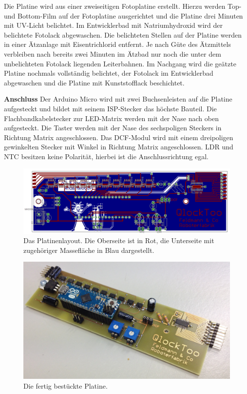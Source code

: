 \begin{multicols}{2}
Die Platine wird aus einer zweiseitigen Fotoplatine erstellt. Hierzu werden Top- und Bottom-Film auf der Fotoplatine ausgerichtet und die Platine drei Minuten mit UV-Licht belichtet. Im Entwicklerbad mit Natriumhydroxid wird der belichtete Fotolack abgewaschen. Die belichteten Stellen auf der Platine werden in einer Ätzanlage mit Eisentrichlorid entfernt. Je nach Güte des Ätzmittels verbleiben nach bereits zwei Minuten im Ätzbad nur noch die unter dem unbelichteten Fotolack liegenden Leiterbahnen. Im Nachgang wird die geätzte Platine nochmals vollständig belichtet, der Fotolack im Entwicklerbad abgewaschen und die Platine mit Kunststofflack beschichtet.

\textbf{Anschluss} Der Arduino Micro wird mit zwei Buchsenleisten auf die Platine aufgesteckt und bildet mit seinem ISP-Stecker das höchste Bauteil. Die Flachbandkabelstecker zur LED-Matrix werden mit der Nase nach oben aufgesteckt. Die Taster werden mit der Nase des sechspoligen Steckers in Richtung Matrix angeschlossen. Das DCF-Modul wird mit einem dreipoligen gewinkelten Stecker mit Winkel in Richtung Matrix angeschlossen. LDR und NTC besitzen keine Polarität, hierbei ist die Anschlussrichtung egal.
\end{multicols}

\begin{figure}[H]
    \centering
    \includegraphics[width=\textwidth]{Abbildungen/Elektronik/Layout01}
    \caption[]{Das Platinenlayout. Die Oberseite ist in Rot, die Unterseite mit zugehöriger Massefläche in Blau dargestellt.}
\end{figure}


\begin{figure}[H]
    \centering
    \includegraphics[width=\textwidth]{Abbildungen/Elektronik/Platine_bestueckt}
    \caption[]{Die fertig bestückte Platine.}
\end{figure}




